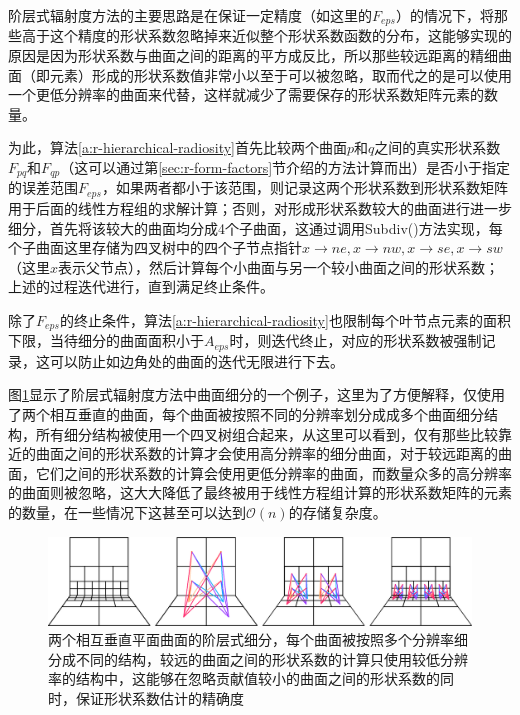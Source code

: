 阶层式辐射度方法的主要思路是在保证一定精度（如这里的$F_{eps}$）的情况下，将那些高于这个精度的形状系数忽略掉来近似整个形状系数函数的分布，这能够实现的原因是因为形状系数与曲面之间的距离的平方成反比，所以那些较远距离的精细曲面（即元素）形成的形状系数值非常小以至于可以被忽略，取而代之的是可以使用一个更低分辨率的曲面来代替，这样就减少了需要保存的形状系数矩阵元素的数量。

为此，算法\ref{a:r-hierarchical-radiosity}首先比较两个曲面$p$和$q$之间的真实形状系数$F_{pq}$和$F_{qp}$（这可以通过第\ref{sec:r-form-factors}节介绍的方法计算而出）是否小于指定的误差范围$F_{eps}$，如果两者都小于该范围，则记录这两个形状系数到形状系数矩阵用于后面的线性方程组的求解计算；否则，对形成形状系数较大的曲面进行进一步细分，首先将该较大的曲面均分成4个子曲面，这通过调用Subdiv()方法实现，每个子曲面这里存储为四叉树中的四个子节点指针$x\to ne,x\to nw,x\to se,x\to sw$（这里$x$表示父节点），然后计算每个小曲面与另一个较小曲面之间的形状系数；上述的过程迭代进行，直到满足终止条件。

除了$F_{eps}$的终止条件，算法\ref{a:r-hierarchical-radiosity}也限制每个叶节点元素的面积下限，当待细分的曲面面积小于$A_{eps}$时，则迭代终止，对应的形状系数被强制记录，这可以防止如边角处的曲面的迭代无限进行下去。

图\ref{f:r-hierarchical-interactions}显示了阶层式辐射度方法中曲面细分的一个例子，这里为了方便解释，仅使用了两个相互垂直的曲面，每个曲面被按照不同的分辨率划分成成多个曲面细分结构，所有细分结构被使用一个四叉树组合起来，从这里可以看到，仅有那些比较靠近的曲面之间的形状系数的计算才会使用高分辨率的细分曲面，对于较远距离的曲面，它们之间的形状系数的计算会使用更低分辨率的曲面，而数量众多的高分辨率的曲面则被忽略，这大大降低了最终被用于线性方程组计算的形状系数矩阵的元素的数量，在一些情况下这甚至可以达到$\mathcal{O}(n)$的存储复杂度。

\begin{figure}
\begin{fullwidth}
	\includegraphics[width=1.0\thewidth]{figures/r/hierarchical-interactions}
	\caption{两个相互垂直平面曲面的阶层式细分，每个曲面被按照多个分辨率细分成不同的结构，较远的曲面之间的形状系数的计算只使用较低分辨率的结构中，这能够在忽略贡献值较小的曲面之间的形状系数的同时，保证形状系数估计的精确度}
	\label{f:r-hierarchical-interactions}
\end{fullwidth}
\end{figure}

